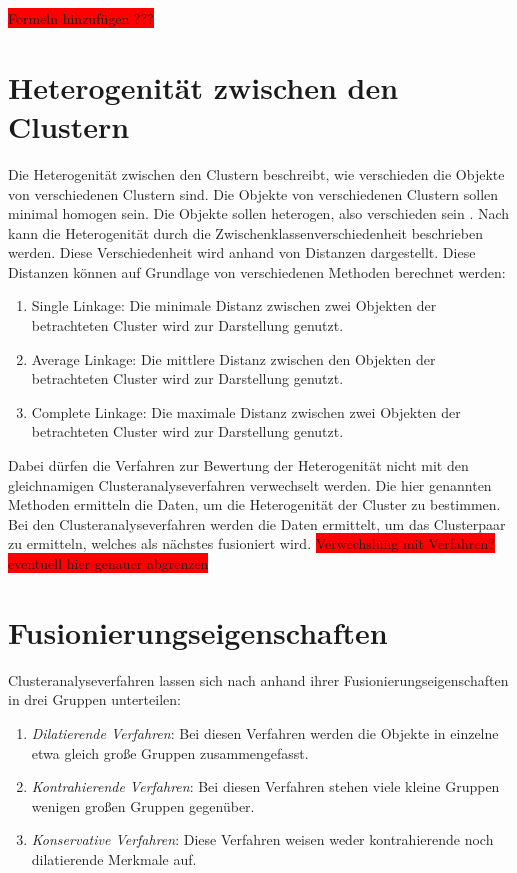 \colorbox{red}{Formeln hinzufügen ???}
\section{Heterogenität zwischen den Clustern}
Die Heterogenität zwischen den Clustern beschreibt, wie verschieden die Objekte von verschiedenen Clustern sind. Die Objekte von verschiedenen Clustern sollen minimal homogen sein. Die Objekte sollen heterogen, also verschieden sein \citep[Vgl.][S. 16]{Bacher.2010}.
Nach \citet[S. 181]{Bankhofer.2008} kann die Heterogenität durch die Zwischenklassenverschiedenheit beschrieben werden. Diese Verschiedenheit wird anhand von Distanzen dargestellt. Diese Distanzen können auf Grundlage von verschiedenen Methoden berechnet werden:
\begin{enumerate}
        \item Single Linkage: Die minimale Distanz zwischen zwei Objekten der betrachteten Cluster wird zur Darstellung genutzt.
        \item Average Linkage: Die mittlere Distanz zwischen den Objekten der betrachteten Cluster wird zur Darstellung genutzt.
        \item Complete Linkage: Die maximale Distanz zwischen zwei Objekten der betrachteten Cluster wird zur Darstellung genutzt.
\end{enumerate}
Dabei dürfen die Verfahren zur Bewertung der Heterogenität nicht mit den gleichnamigen Clusteranalyseverfahren verwechselt werden. Die hier genannten Methoden ermitteln die Daten, um die Heterogenität der Cluster zu bestimmen. Bei den Clusteranalyseverfahren werden die Daten ermittelt, um das Clusterpaar zu ermitteln, welches als nächstes fusioniert wird. 
\colorbox{red}{Verwechslung mit Verfahren? eventuell hier genauer abgrenzen} 

\section{Fusionierungseigenschaften}
Clusteranalyseverfahren lassen sich nach \citet[S. 488/489]{Backhaus.2016} anhand ihrer Fusionierungseigenschaften in drei Gruppen unterteilen:
\begin{enumerate}
        \item \textit{Dilatierende Verfahren}: Bei diesen Verfahren werden die Objekte in einzelne etwa gleich große Gruppen zusammengefasst.
        \item \textit{Kontrahierende Verfahren}: Bei diesen Verfahren stehen viele kleine Gruppen wenigen großen Gruppen gegenüber.
        \item \textit{Konservative Verfahren}: Diese Verfahren weisen weder kontrahierende noch dilatierende Merkmale auf.
\end{enumerate}
